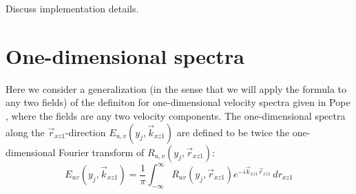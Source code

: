 \documentclass[letterpaper,11pt,nointlimits,reqno]{amsart}
\begin{document}
Discuss implementation details.


\section{One-dimensional spectra
         \citep[\textsection{}6.5]{Pope2000Turbulent}}

Here we consider a generalization (in the sense that we will apply the formula
to any two fields) of the definiton for one-dimensional velocity spectra given
in Pope \citep[\textsection{}6.3]{Pope2000Turbulent}, where the fields are any
two velocity components.  The one-dimensional spectra along the
$\vec{r}_{xz1}$-direction  $E_{u,v}(y_j,\vec{k}_{xz1})$ are defined to be twice
the one-dimensional Fourier transform of $R_{u,v}(y_j,\vec{r}_{xz1})$:
%
\begin{equation}
E_{uv}(y_j,\vec{k}_{xz1}) = \frac{1}{\pi} \int_{-\infty}^{\infty}
                           R_{uv}(y_j,\vec{r}_{xz1}) 
                           e^{-i \vec{k}_{xz1} \vec{r}_{xz1}} \,d\!r_{xz1}
\end{equation}
%


\newcommand*{\doi}[1]{\href{http://dx.doi.org/\detokenize{#1}}{doi: #1}}


\end{document}
